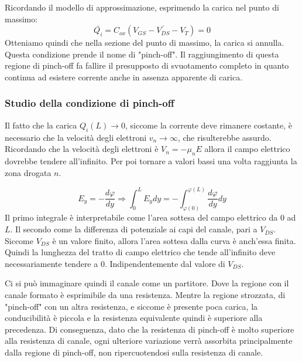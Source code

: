 \documentclass[../template]{subfiles}
\begin{document}
Ricordando il modello di approssimazione, esprimendo la carica nel punto di massimo:
\[
    \bar{Q_i} = C_{ox} (V_{GS} - \bar{V_{DS}} - V_T) = 0
\]
Otteniamo quindi che nella sezione del punto di massimo, la carica si annulla. Questa condizione prende il nome di "pinch-off". Il raggiungimento di questa regione di pinch-off fa fallire il presupposto di svuotamento completo in quanto continua ad esistere corrente anche in assenza apparente di carica.
\subsubsection{Studio della condizione di pinch-off}
Il fatto che la carica $Q_i(L) \to 0$, siccome la corrente deve rimanere costante, è necessario che la velocità degli elettroni $v_n \to \infty$, che risulterebbe assurdo.
Ricordando che la velocità degli elettroni è $V_n = - \mu_n E$ allora il campo elettrico dovrebbe tendere all'infinito. Per poi tornare a valori bassi una volta raggiunta la zona drogata $n$.

\[
    E_y = - \frac{d\varphi}{dy} \Rightarrow \int_0^L E_y dy = - \int_{\varphi(0)}^{\varphi(L)} \frac{d\varphi}{dy} dy
\]
Il primo integrale è interpretabile come l'area sottesa del campo elettrico da $0$ ad $L$. Il secondo come la differenza di potenziale ai capi del canale, pari a $V_{DS}$. Siccome $V_{DS}$ è un valore finito, allora l'area sottesa dalla curva è anch'essa finita.
Quindi la lunghezza del tratto di campo elettrico che tende all'infinito deve necessariamente tendere a 0. Indipendentemente dal valore di $V_{DS}$.

Ci si può immaginare quindi il canale come un partitore. Dove la regione con il canale formato è esprimibile da una resistenza. Mentre la regione strozzata, di "pinch-off" con un altra resistenza, e siccome è presente poca carica, la conducibilità è piccola e la resistenza equivalente quindi è superiore alla precedenza.
Di conseguenza, dato che la resistenza di pinch-off è molto superiore alla resistenza di canale, ogni ulteriore variazione verrà assorbita principalmente dalla regione di pinch-off, non ripercuotendosi sulla resistenza di canale.
\end{document}
